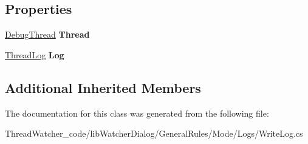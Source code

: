 \subsection*{Properties}
\begin{DoxyCompactItemize}
\item 
\hypertarget{classlib_watcher_dialog_1_1_general_rules_1_1_mode_1_1_logs_1_1_write_log_a34dd29237a8eb1019bfcfc323cb056e2}{\hyperlink{classlib_wather_debugger_1_1_thread_1_1_debug_thread}{Debug\+Thread} {\bfseries Thread}}\label{classlib_watcher_dialog_1_1_general_rules_1_1_mode_1_1_logs_1_1_write_log_a34dd29237a8eb1019bfcfc323cb056e2}

\item 
\hypertarget{classlib_watcher_dialog_1_1_general_rules_1_1_mode_1_1_logs_1_1_write_log_a5b854670854735b48cb73c540999c84d}{\hyperlink{classlib_watcher_dialog_1_1_property_item_1_1_logger_1_1_thread_log}{Thread\+Log} {\bfseries Log}}\label{classlib_watcher_dialog_1_1_general_rules_1_1_mode_1_1_logs_1_1_write_log_a5b854670854735b48cb73c540999c84d}

\end{DoxyCompactItemize}
\subsection*{Additional Inherited Members}


The documentation for this class was generated from the following file\+:\begin{DoxyCompactItemize}
\item 
Thread\+Watcher\+\_\+code/lib\+Watcher\+Dialog/\+General\+Rules/\+Mode/\+Logs/Write\+Log.\+cs\end{DoxyCompactItemize}
